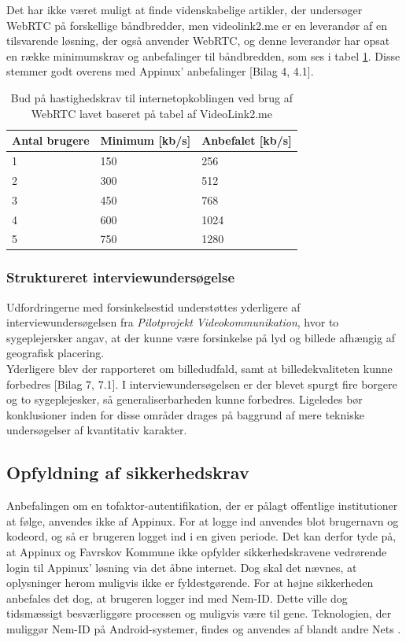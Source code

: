Det har ikke været muligt at finde videnskabelige artikler, der undersøger WebRTC på forskellige båndbredder, men videolink2.me er en leverandør af en tilsvarende løsning, der også anvender WebRTC, og denne leverandør har opsat en række minimumskrav og anbefalinger til båndbredden, som ses i tabel \ref{tab:hastighedtabel}. Disse stemmer godt overens med Appinux' anbefalinger [Bilag 4, 4.1].
\begin{table}[H]
\caption{Bud på hastighedskrav til internetopkoblingen ved brug af WebRTC lavet baseret på tabel af VideoLink2.me \cite{videolink2me}}
\label{tab:hastighedtabel}
\centering
\begin{tabular}{|l|l|l|}
\hline
\textbf{Antal brugere} & \textbf{Minimum} [kb/s]  & \textbf{Anbefalet}  [kb/s] \\ \hline
1             & 150          & 256          \\ \hline
2             & 300          & 512          \\ \hline
3             & 450          & 768          \\ \hline
4             & 600          & 1024          \\ \hline
5             & 750          & 1280          \\ \hline
\end{tabular}

\end{table}

\subsubsection{Struktureret interviewundersøgelse}
Udfordringerne med forsinkelsestid understøttes yderligere af interviewundersøgelsen fra \textit{Pilotprojekt Videokommunikation}, hvor to sygeplejersker angav, at der kunne være forsinkelse på lyd og billede afhængig af geografisk placering. \\Yderligere blev der rapporteret om billedudfald, samt at billedekvaliteten kunne forbedres [Bilag 7, 7.1]. I interviewundersøgelsen er der blevet spurgt fire borgere og to sygeplejesker, så generaliserbarheden kunne forbedres. Ligeledes bør konklusioner inden for disse områder drages på baggrund af mere tekniske undersøgelser af kvantitativ karakter.


\subsection{Opfyldning af sikkerhedskrav}
Anbefalingen om en tofaktor-autentifikation, der er pålagt offentlige institutioner at følge, anvendes ikke af Appinux. For at logge ind anvendes blot brugernavn og kodeord, og så er brugeren logget ind i en given periode. Det kan derfor tyde på, at Appinux og Favrskov Kommune ikke opfylder sikkerhedskravene vedrørende login til Appinux' løsning via det åbne internet. Dog skal det nævnes, at oplysninger herom muligvis ikke er fyldestgørende. For at højne sikkerheden anbefales det dog, at brugeren logger ind med Nem-ID. Dette ville dog tidsmæssigt besværliggøre processen og muligvis være til gene. Teknologien, der muliggør Nem-ID på Android-systemer, findes og anvendes af blandt andre Nets \cite{netsapp}.

